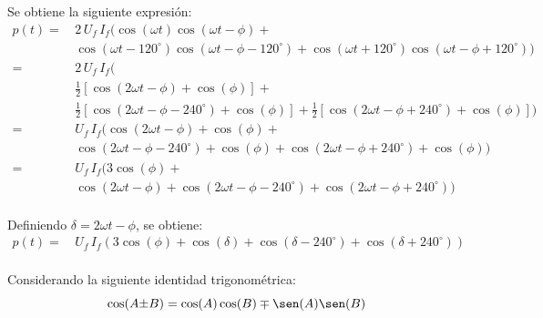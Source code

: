 \documentclass[letter,11pt]{article}
\begin{document}
\begin{enumerate}
Se obtiene la siguiente expresión:
\begin{equation*}
    \begin{split}
        p(t) =\,& 2\,U_f\,I_f(
                  \cos(\omega{t})\cos(\omega{t}-\phi)+\\
                & \cos(\omega{t}-120^{\circ})\cos(\omega{t}-\phi-120^{\circ})+
                  \cos(\omega{t}+120^{\circ})\cos(\omega{t}-\phi+120^{\circ}))\\
             =\,& 2\,U_f\,I_f(\\
                & \frac{1}{2}\left[\cos(2\omega{t}-\phi)+\cos(\phi)\right]+\\
                & \frac{1}{2}\left[\cos(2\omega{t}-\phi-240^{\circ})+\cos(\phi)\right]+
                  \frac{1}{2}\left[\cos(2\omega{t}-\phi+240^{\circ})+\cos(\phi)\right])\\
             =\,& U_f\,I_f(
                  \cos(2\omega{t}-\phi)+\cos(\phi)+\\
                & \cos(2\omega{t}-\phi-240^{\circ})+\cos(\phi)+
                  \cos(2\omega{t}-\phi+240^{\circ})+\cos(\phi))\\
             =\,& U_f\,I_f(
                  3\cos(\phi)+\\
                & \cos(2\omega{t}-\phi)+
                  \cos(2\omega{t}-\phi-240^{\circ})+
                  \cos(2\omega{t}-\phi+240^{\circ}))\\
    \end{split}
\end{equation*}

Definiendo $\delta = 2\omega{t} - \phi$, se obtiene:
\begin{equation*}
    \begin{split}
        p(t) =\,& U_f\,I_f(
                  3\cos(\phi)+
                  \cos(\delta)+
                  \cos(\delta-240^{\circ})+
                  \cos(\delta+240^{\circ}))\\
    \end{split}
\end{equation*}

Considerando la siguiente identidad trigonométrica:
\begin{equation*}
    \cos(A{\pm}B) = \cos(A)\cos(B) \mp \sen(A)\sen(B)
\end{equation*}


\end{enumerate}
\end{document}

